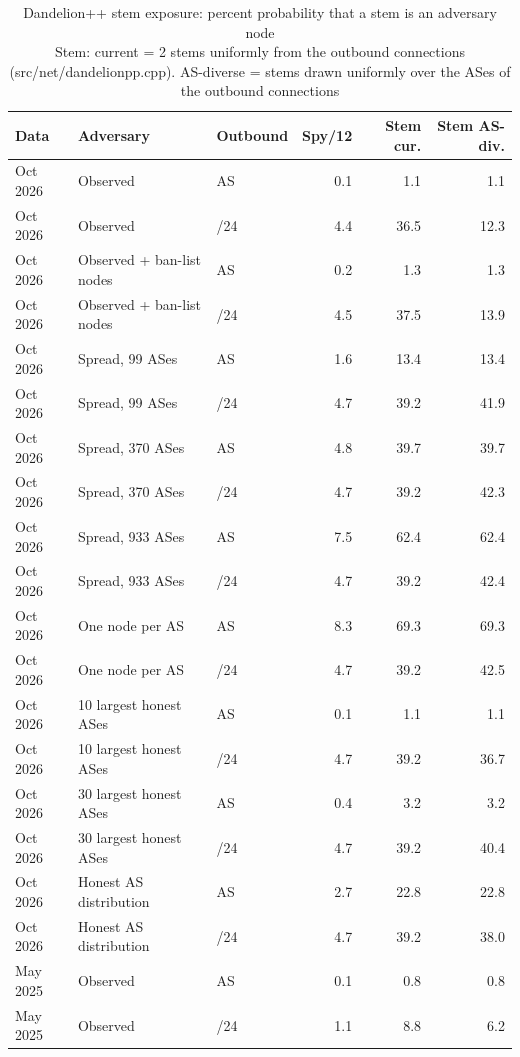 \begin{table}[t]
\caption{
{\fontsize{20}{25}\selectfont  Dandelion++ stem exposure: percent probability that a stem is an adversary node\small } \\ 
{\fontsize{14}{17}\selectfont  Stem: current = 2 stems uniformly from the outbound connections (src/net/dandelionpp.cpp). AS-diverse = stems drawn uniformly over the ASes of the outbound connections\small }
} 
\begin{tabular*}{\linewidth}{@{\extracolsep{\fill}}lllrrr}
\toprule
Data & Adversary & Outbound & Spy/12 & Stem cur. & Stem AS-div. \\ 
\midrule\addlinespace[2.5pt]
Oct 2026 & Observed & AS & 0.1 & 1.1 & 1.1 \\ 
Oct 2026 & Observed & /24 & 4.4 & 36.5 & 12.3 \\ 
Oct 2026 & Observed + ban-list nodes & AS & 0.2 & 1.3 & 1.3 \\ 
Oct 2026 & Observed + ban-list nodes & /24 & 4.5 & 37.5 & 13.9 \\ 
Oct 2026 & Spread, 99 ASes & AS & 1.6 & 13.4 & 13.4 \\ 
Oct 2026 & Spread, 99 ASes & /24 & 4.7 & 39.2 & 41.9 \\ 
Oct 2026 & Spread, 370 ASes & AS & 4.8 & 39.7 & 39.7 \\ 
Oct 2026 & Spread, 370 ASes & /24 & 4.7 & 39.2 & 42.3 \\ 
Oct 2026 & Spread, 933 ASes & AS & 7.5 & 62.4 & 62.4 \\ 
Oct 2026 & Spread, 933 ASes & /24 & 4.7 & 39.2 & 42.4 \\ 
Oct 2026 & One node per AS & AS & 8.3 & 69.3 & 69.3 \\ 
Oct 2026 & One node per AS & /24 & 4.7 & 39.2 & 42.5 \\ 
Oct 2026 & 10 largest honest ASes & AS & 0.1 & 1.1 & 1.1 \\ 
Oct 2026 & 10 largest honest ASes & /24 & 4.7 & 39.2 & 36.7 \\ 
Oct 2026 & 30 largest honest ASes & AS & 0.4 & 3.2 & 3.2 \\ 
Oct 2026 & 30 largest honest ASes & /24 & 4.7 & 39.2 & 40.4 \\ 
Oct 2026 & Honest AS distribution & AS & 2.7 & 22.8 & 22.8 \\ 
Oct 2026 & Honest AS distribution & /24 & 4.7 & 39.2 & 38.0 \\ 
May 2025 & Observed & AS & 0.1 & 0.8 & 0.8 \\ 
May 2025 & Observed & /24 & 1.1 & 8.8 & 6.2 \\ 
\bottomrule
\end{tabular*}
\label{table-stem}
\end{table}
